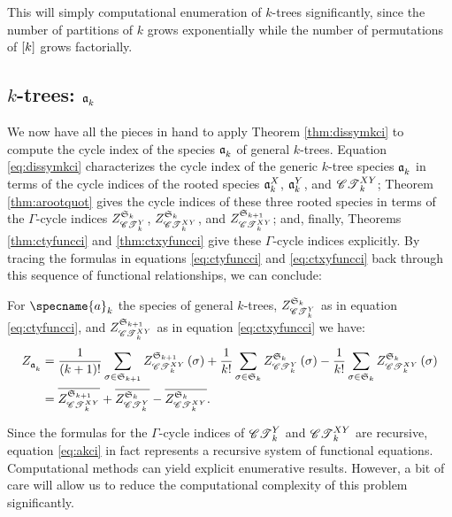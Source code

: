\documentclass[distribution,draft]{brandiss} %
\numberwithin{section}{chapter}
\numberwithin{figure}{chapter}
\begin{document}
This will simply computational enumeration of $k$-trees significantly, since the number of partitions of $k$ grows exponentially while the number of permutations of $\sbrac{k}$ grows factorially.

\subsection{$k$-trees: $\kt{k}$}\label{ss:ktcycind}
We now have all the pieces in hand to apply Theorem \ref{thm:dissymkci} to compute the cycle index of the species $\kt{k}$ of general $k$-trees.
Equation \eqref{eq:dissymkci} characterizes the cycle index of the generic $k$-tree species $\kt{k}$ in terms of the cycle indices of the rooted species $\ktx{k}$, $\kty{k}$, and $\ctxy{k}$; Theorem \ref{thm:arootquot} gives the cycle indices of these three rooted species in terms of the $\Gamma$-cycle indices $\gci{\symgp{k}}{\cty{k}}$, $\gci{\symgp{k}}{\ctxy{k}}$, and $\gci{\symgp{k+1}}{\ctxy{k}}$; and, finally, Theorems \ref{thm:ctyfuncci} and \ref{thm:ctxyfuncci} give these $\Gamma$-cycle indices explicitly.
By tracing the formulas in equations \ref{eq:ctyfuncci} and \ref{eq:ctxyfuncci} back through this sequence of functional relationships, we can conclude:
\begin{theorem}
  \label{thm:akci}
  For $\specname{a}_{k}$ the species of general $k$-trees, $\gci{\symgp{k}}{\cty{k}}$ as in equation \eqref{eq:ctyfuncci}, and $\gci{\symgp{k+1}}{\ctxy{k}}$ as in equation \eqref{eq:ctxyfuncci} we have:
  \label{thm:ktreecyc}
  \begin{subequations}
    \label{eq:akci}
    \begin{align}
      \ci{\kt{k}} &= \frac{1}{\pbrac{k+1}!} \sum_{\sigma \in \symgp{k+1}} \gcielt{\symgp{k+1}}{\ctxy{k}}{\sigma} + \frac{1}{k!} \sum_{\sigma \in \symgp{k}} \gcielt{\symgp{k}}{\cty{k}}{\sigma} - \frac{1}{k!} \sum_{\sigma \in \symgp{k}} \gcielt{\symgp{k}}{\ctxy{k}}{\sigma} \label{eq:akciexplicit} \\
      &= \qgci{\symgp{k+1}}{\ctxy{k}} + \qgci{\symgp{k}}{\cty{k}} - \qgci{\symgp{k}}{\ctxy{k}}. \label{eq:akciquot}
    \end{align}
  \end{subequations}

\end{theorem}

Since the formulas for the $\Gamma$-cycle indices of $\cty{k}$ and $\ctxy{k}$ are recursive, equation \eqref{eq:akci} in fact represents a recursive system of functional equations.
Computational methods can yield explicit enumerative results.
However, a bit of care will allow us to reduce the computational complexity of this problem significantly.
\end{document}
